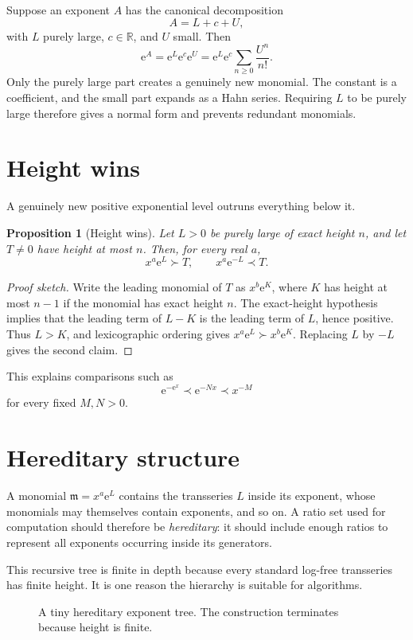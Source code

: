 \documentclass[11pt,oneside]{book}
\newtheorem{proposition}[theorem]{Proposition}
\theoremstyle{definition}
\theoremstyle{remark}
\newcommand{\R}{\mathbb{R}}
\newcommand{\m}{\mathfrak{m}}
\newcommand{\e}{\mathrm{e}}
\newcommand{\precdom}{\prec}
\newcommand{\succdom}{\succ}
\begin{document}
Suppose an exponent $A$ has the canonical decomposition
\[
  A=L+c+U,
\]
with $L$ purely large, $c\in\R$, and $U$ small. Then
\[
  \e^A=\e^L\e^c\e^U
  =\e^L\e^c\sum_{n\ge0}\frac{U^n}{n!}.
\]
Only the purely large part creates a genuinely new monomial. The constant is a
coefficient, and the small part expands as a Hahn series. Requiring $L$ to be
purely large therefore gives a normal form and prevents redundant monomials.

\section{Height wins}

A genuinely new positive exponential level outruns everything below it.

\begin{proposition}[Height wins]
Let $L>0$ be purely large of exact height $n$, and let $T\ne0$ have height at
most $n$. Then, for every real $a$,
\[
  x^a\e^L\succdom T,
  \qquad
  x^a\e^{-L}\precdom T.
\]
\end{proposition}

\begin{proof}[Proof sketch]
Write the leading monomial of $T$ as $x^b\e^K$, where $K$ has height at most
$n-1$ if the monomial has exact height $n$. The exact-height hypothesis implies
that the leading term of $L-K$ is the leading term of $L$, hence positive. Thus
$L>K$, and lexicographic ordering gives $x^a\e^L\succdom x^b\e^K$. Replacing
$L$ by $-L$ gives the second claim.
\end{proof}

This explains comparisons such as
\[
  \e^{-\e^x}\precdom \e^{-Nx}\precdom x^{-M}
\]
for every fixed $M,N>0$.

\section{Hereditary structure}

A monomial $\m=x^a\e^L$ contains the transseries $L$ inside its exponent, whose
monomials may themselves contain exponents, and so on. A ratio set used for
computation should therefore be \emph{hereditary}: it should include enough
ratios to represent all exponents occurring inside its generators.

This recursive tree is finite in depth because every standard log-free
transseries has finite height. It is one reason the hierarchy is suitable for
algorithms.

\begin{figure}[ht]
\centering
{}
\caption{A tiny hereditary exponent tree. The construction terminates because height is finite.}
\label{fig:height-tree}
\end{figure}
\end{document}
